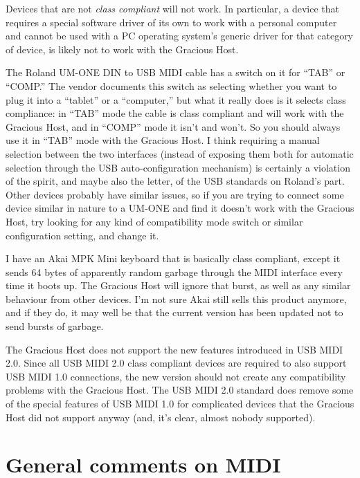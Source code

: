 Devices that are not \emph{class compliant} will not work.  In particular, a
device that requires a special software driver of its own to work with a
personal computer and cannot be used with a PC operating system's generic
driver for that category of device, is likely not to work with the Gracious
Host.

The Roland UM-ONE DIN to USB MIDI cable has a switch on it for ``TAB'' or
``COMP.'' The vendor documents this switch as selecting whether you want to
plug it into a ``tablet'' or a ``computer,'' but what it really does is it
selects class compliance:  in ``TAB'' mode the cable is class compliant and
will work with the Gracious Host, and in ``COMP'' mode it isn't and won't. 
So you should always use it in ``TAB'' mode with the Gracious Host.  I think
requiring a manual selection between the two interfaces (instead of exposing
them both for automatic selection through the USB auto-configuration
mechanism) is certainly a violation of the spirit, and maybe also the
letter, of the USB standards on Roland's part.  Other devices probably have
similar issues, so if you are trying to connect some device similar in
nature to a UM-ONE and find it doesn't work with the Gracious Host, try
looking for any kind of compatibility mode switch or similar configuration
setting, and change it.

I have an Akai MPK Mini keyboard that is basically class compliant, except
it sends 64 bytes of apparently random garbage through the MIDI interface
every time it boots up.  The Gracious Host will ignore that burst, as well
as any similar behaviour from other devices.  I'm not sure Akai still sells
this product anymore, and if they do, it may well be that the current
version has been updated not to send bursts of garbage.

The Gracious Host does not support the new features introduced in USB MIDI
2.0.  Since all USB MIDI 2.0 class compliant devices are required to also
support USB MIDI 1.0 connections, the new version should not create any
compatibility problems with the Gracious Host.  The USB MIDI 2.0 standard
does remove some of the special features of USB MIDI 1.0 for complicated
devices that the Gracious Host did not support anyway (and, it's clear,
almost nobody supported).


\section{General comments on MIDI}

